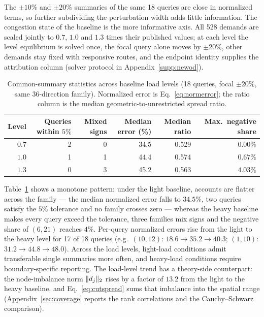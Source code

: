 The $\pm10\%$ and $\pm20\%$ summaries of the same 18 queries are close in normalized terms, so further subdividing the perturbation width adds little information. The congestion state of the baseline is the more informative axis. All 528 demands are scaled jointly to $0.7$, $1.0$ and $1.3$ times their published values; at each level the level equilibrium is solved once, the focal query alone moves by $\pm20\%$, other demands stay fixed with responsive routes, and the endpoint identity supplies the attribution column (solver protocol in Appendix~\ref{supp:newod}).
\begin{table}[t]\centering\footnotesize
\caption{Common-summary statistics across baseline load levels (18
queries, focal $\pm20\%$, same 36-direction family). Normalized error
is Eq.~\eqref{eq:normerror}; the ratio column is the median
geometric-to-unrestricted spread ratio.}\label{tab:loadlevels}
\begin{tabular}{rrrrrr}\toprule
Level & Queries within $5\%$ & Mixed signs & Median error (\%) & Median ratio & Max.\ negative share\\\midrule
$0.7$ & 2 & 0 & 34.5 & 0.529 & $0.00\%$\\
$1.0$ & 1 & 1 & 44.4 & 0.574 & $0.67\%$\\
$1.3$ & 0 & 3 & 45.2 & 0.563 & $4.03\%$\\
\bottomrule\end{tabular}\end{table}
Table~\ref{tab:loadlevels} shows a monotone pattern: under the light
baseline, accounts are flatter across the family --- the median
normalized error falls to $34.5\%$, two queries satisfy the $5\%$
tolerance and no family crosses zero --- whereas the heavy baseline
makes every query exceed the tolerance, three families mix signs and
the negative share of $(6,21)$ reaches $4\%$. Per-query normalized
errors rise from the light to the heavy level for 17 of 18 queries
(e.g.\ $(10,12)$: $18.6\to35.2\to40.3$; $(1,10)$: $31.2\to44.8\to48.0$).
Across the load levels, light-load conditions admit transferable single
summaries more often, and heavy-load conditions require
boundary-specific reporting. The load-level trend has a theory-side
counterpart: the node-imbalance norm $\lVert d_j \rVert_2$ rises by a factor
of $13.2$ from the light to the heavy baseline, and Eq.~\eqref{eq:cutspread}
sums that imbalance into the spatial range
(Appendix~\ref{sec:coverage} reports the rank correlations and the
Cauchy--Schwarz comparison).

